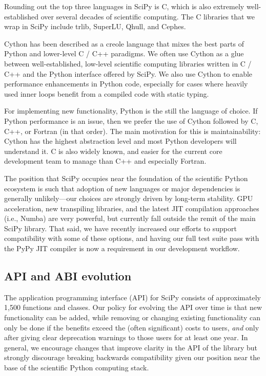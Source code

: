 \documentclass[fleqn,10pt]{wlscirep}
\begin{document}
Rounding out the top three languages in SciPy is C, which is also extremely
well-established over several decades\cite{Kernighan:1988:CPL:576122} of
scientific computing. The C libraries that we wrap in SciPy include 
trlib\cite{doi:10.1080/10556788.2018.1449842}, %
SuperLU\cite{li05,superlu_ug99}, %
Qhull\cite{Barber:1996:QAC:235815.235821}, and %
Cephes\cite{cephes_netlib}. %

Cython has been described as a creole language that mixes the best parts of Python and
lower-level C / C++ paradigms\cite{behnel2011cython}. We often use Cython
as a glue between well-established, low-level scientific computing libraries written
in C / C++ and the Python interface offered by SciPy. We also use Cython to enable performance
enhancements in Python code, especially for cases where heavily used inner
loops benefit from a compiled code with static typing. 

For implementing new functionality, Python is the still the language of choice. If Python 
performance is an issue, then we prefer the use of Cython followed by C, C++, or Fortran (in that
order). The main motivation for this is maintainability: Cython has the 
highest abstraction level and most Python developers will understand it. C is 
also widely known, and easier for the current core development team to manage
than C++ and especially Fortran. 

The position that SciPy occupies near the
foundation of the scientific Python ecosystem is such that adoption of new
languages or major dependencies is generally unlikely---our choices are strongly
driven by long-term stability. GPU acceleration, new transpiling libraries, and
the latest JIT compilation approaches (i.e.,
Numba\cite{Lam:2015:NLP:2833157.2833162}) are very powerful, but currently fall
outside the remit of the main SciPy library. That said, we have recently
increased our efforts to support compatibility with some of these options, and
having our full test suite pass with the PyPy JIT
compiler\cite{Bolz:2009:TMP:1565824.1565827} is now a requirement in our
development workflow.

\subsection*{API and ABI evolution}

The application programming interface (API) for SciPy consists of approximately
1,500 functions and classes.  Our policy for evolving the API over time is that
new functionality can be added, while removing or changing existing
functionality can only be done if the benefits exceed the (often
significant) costs to users, \textit{and} only after giving clear deprecation
warnings to those users for at least one year. In general, we encourage
changes that improve clarity in the API of the library but strongly discourage
breaking backwards compatibility given our position near the base of the 
scientific Python computing stack.
\end{document}
